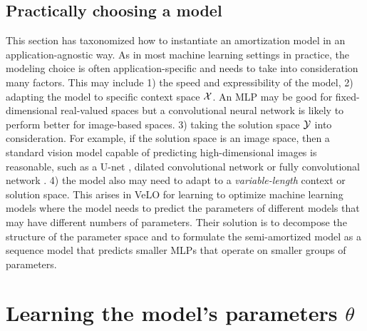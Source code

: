 \subsection{Practically choosing a model}
This section has taxonomized how to instantiate an amortization
model in an application-agnostic way. As in most machine learning
settings in practice, the modeling choice is often
application-specific and needs to take into consideration many factors.
This may include 1) the speed and expressibility of the model,
2) adapting the model to specific context space ${\mathcal{X}}$.
An MLP may be good for fixed-dimensional
real-valued spaces but a convolutional neural network
is likely to perform better for image-based spaces.
3) taking the solution space ${\mathcal{Y}}$ into consideration.
For example, if the solution space is an image space,
then a standard vision model capable of predicting
high-dimensional images is reasonable, such as a
U-net \citep{ronneberger2015u},
dilated convolutional network \citep{yu2015multi}
or fully convolutional network \citep{long2015fully}.
4) the model also may need to adapt to a
\emph{variable-length} context or solution space.
This arises in VeLO \citep{metz2022velo} for learning
to optimize machine learning models where the model needs
to predict the parameters of different models that may
have different numbers of parameters.
Their solution is to decompose the structure of the
parameter space and to formulate the semi-amortized
model as a sequence model that predicts smaller MLPs
that operate on smaller groups of parameters.

\section{Learning the model's parameters $\theta$}
\label{sec:learning}

